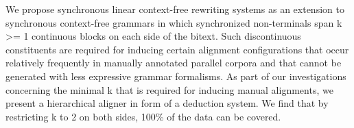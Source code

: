 We propose synchronous linear context-free rewriting systems as an extension to synchronous context-free grammars in which synchronized non-terminals span k >=
 1 continuous blocks on each side of the bitext.
 Such discontinuous constituents are required for inducing certain alignment
 configurations that occur relatively frequently in manually annotated parallel
 corpora and that cannot be generated with less expressive grammar formalisms.
 As part of our investigations concerning the minimal k that is required for
 inducing manual alignments, we present a hierarchical aligner in form of a
 deduction system. We find that by restricting k to 2 on both sides, 100\% of the
 data can be covered.

